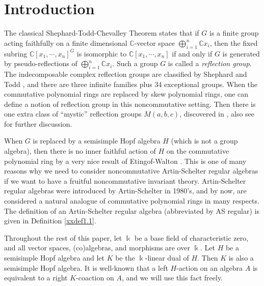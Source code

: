 

\maketitle

\setcounter{section}{-1}

\section{Introduction}
\label{xxsec0}

The classical Shephard-Todd-Chevalley Theorem states that if $G$ is 
a finite group acting faithfully on a finite dimensional 
${\mathbb C}$-vector space $\bigoplus_{i=1}^n {\mathbb C} x_i$, 
then the fixed subring ${\mathbb C}[x_1,\cdots, x_n]^G$ is isomorphic 
to ${\mathbb C}[x_1,\cdots, x_n]$ if and only if $G$ is generated by 
pseudo-reflections of $\bigoplus_{i=1}^n {\mathbb C} x_i$. 
Such a group $G$ is called a {\it reflection group}. 
The indecomposable complex reflection groups are classified 
by Shephard and Todd \cite{ST}, and there are three infinite families 
plus 34 exceptional groups. When the commutative polynomial rings are 
replaced by skew polynomial rings, one can define a notion of reflection group 
in this noncommutative setting. Then there is one extra class of ``mystic'' 
reflection groups $M(a,b,c)$, discovered in \cite{KKZ2}, also see \cite{BB} 
for further discussion.

When $G$ is replaced by a semisimple Hopf algebra $H$ (which is not a 
group algebra), then there is no inner faithful action of $H$ on the 
commutative polynomial ring by a very 
nice result of Etingof-Walton \cite{EW1}. This is one of many reasons
why we need to consider noncommutative Artin-Schelter 
regular algebras if we want to have a fruitful noncommutative invariant 
theory. Artin-Schelter regular algebras were introduced by Artin-Schelter 
\cite{AS} in 1980's, and by now, are considered  a natural analogue of 
commutative polynomial rings in many respects. The definition of an Artin-Schelter 
regular algebra (abbreviated by AS regular) is given in Definition \ref{xxdef1.1}. 

Throughout the rest of this paper, let $\Bbbk$ be a base field of characteristic 
zero, and all vector spaces, (co)algebras, and morphisms are over $\Bbbk$.
Let $H$ be a semisimple Hopf algebra and let $K$ be the 
$\Bbbk$-linear dual of $H$. Then $K$ is also a semisimple 
Hopf algebra. It is well-known that a left $H$-action
on an algebra $A$ is equivalent to a right $K$-coaction 
on $A$, and we will use this fact freely.

